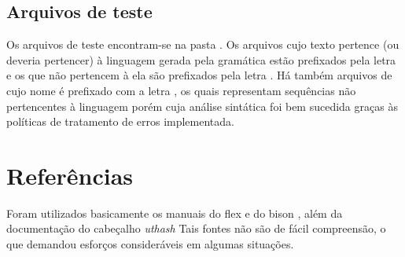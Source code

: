 \documentclass[
	article,			%
	11pt,				%
	oneside,			%
	a4paper,			%
	english,			%
	brazil,				%
	sumario=tradicional
	]{abntex2}
\renewcommand{\it}[1]{\textit{#1}}
\begin{document}
\subsection{Arquivos de teste}
Os arquivos de teste encontram-se na pasta . Os arquivos cujo texto pertence (ou deveria pertencer) à linguagem gerada pela gramática estão prefixados pela letra  e os que não pertencem à ela são prefixados pela letra . Há também arquivos de cujo nome é prefixado com a letra , os quais representam sequências não pertencentes à linguagem porém cuja análise sintática foi bem sucedida graças às políticas de tratamento de erros implementada.

\section{Referências}
Foram utilizados basicamente os manuais do flex \cite{flex} e do bison \cite{bison}, além da documentação do cabeçalho \it{uthash} \cite{uthash}
Tais fontes não são de fácil compreensão, o que demandou esforços consideráveis em algumas situações.
% 

\postextual


\end{document}
